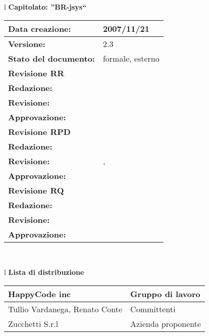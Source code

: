 

\newcommand{\lv}{ 2.3 } %
\newcommand{\dt}{ Piano Di Progetto }%
\newcommand{\Glossario}{ Glossario.1.8.pdf }


\begin{center}
\thispagestyle{plain}
\begin{table}[htbp]

\large{
\begin{tabular}{l}
\Large{\textbf{\textsf{Capitolato: ''BR-jsys``}}} \\
\begin{tabular}{|p{6cm}|p{6cm}|} \hline
\textbf{Data creazione:} & 2007/11/21 \\ \hline
\textbf{Versione:} & \lv \\ \hline
\textbf{Stato del documento:} & formale, esterno \\ \hline
\textbf{Revisione RR} &  \\ \hline
\textbf{Redazione:} & \ET \\ \hline
\textbf{Revisione:} & \MT \\ \hline
\textbf{Approvazione:} & \ET \\ \hline
\textbf{Revisione RPD} &    \\ \hline
\textbf{Redazione:} & \MM \\ \hline
\textbf{Revisione:} & \ET , \FC \\ \hline
\textbf{Approvazione:}  & \MM \\  \hline
\textbf{Revisione RQ} &    \\ \hline
\textbf{Redazione:} & \ET \\ \hline
\textbf{Revisione:} & \LA \\ \hline
\textbf{Approvazione:}  & \MT \\  \hline
\end{tabular} \\
\end{tabular}
}
\end{table}

\begin{table}[hbtp]
\large{
\begin{tabular}{l}
\Large{\textbf{\textsf{Lista di distribuzione}}} \\
\begin{tabular}{|p{6cm}|p{6cm}|} \hline
{HappyCode inc}& Gruppo di lavoro\\ \hline
{Tullio Vardanega, Renato Conte}& Committenti \\ \hline 
{Zucchetti S.r.l}& Azienda proponente\\ \hline
\end{tabular} \\
\end{tabular}
}
\end{table}
\begin{table}[hbtp]


\end{table}
\end{center}
